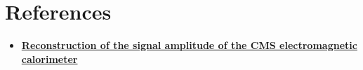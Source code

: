 \documentclass{article}
\begin{document}

\section{References} 

\begin{itemize}

\item \href{http://cds.cern.ch/record/933702?ln=en}{\bf{Reconstruction of the signal amplitude of the CMS electromagnetic calorimeter}}

\end{itemize}

      
\end{document}
